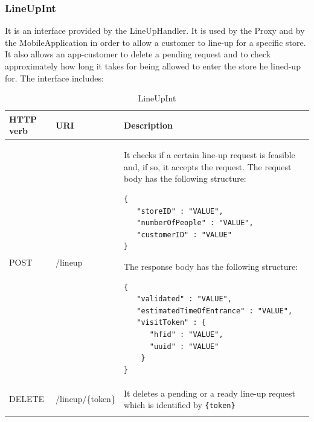 \documentclass[a4paper,oneside,11pt]{book}
\begin{document}
    \subsubsection{LineUpInt}
    It is an interface provided by the LineUpHandler. It is used by the Proxy and by the MobileApplication in order to allow a customer to line-up for a specific store. It also allows an app-customer to delete a pending request and to check approximately how long it takes for being allowed to enter the store he lined-up for. The interface includes:
    \begin{longtable}[c] { |>{\centering\arraybackslash}H{0.11\textwidth}|>{\centering\arraybackslash\ttfamily}P{0.23\textwidth}|H{0.50\textwidth}| }
        \hline
        \textbf{HTTP verb} & \textrm{\textbf{URI}} & \textbf{\textbf{Description}} \\ \hline
        POST & /lineup & It checks if a certain line-up request is feasible and, if so, it accepts the request. The request body has the following structure:
        \begin{lstlisting}[language=jsonDD]
{
   "storeID" : "VALUE",
   "numberOfPeople" : "VALUE",
   "customerID" : "VALUE"
}
        \end{lstlisting}
        The response body has the following structure:
        \begin{lstlisting}[language=jsonDD]
{
   "validated" : "VALUE",
   "estimatedTimeOfEntrance" : "VALUE",
   "visitToken" : {
      "hfid" : "VALUE",
      "uuid" : "VALUE"
    }
}
        \end{lstlisting}  \\ \hline
        DELETE & /lineup/\{token\} & It deletes a pending or a ready line-up request which is identified by \texttt{\{token\}} \\ \hline
        \caption{LineUpInt}
        \label{table:lineup_int}
    \end{longtable} 
    
    \newpage
\end{document}
